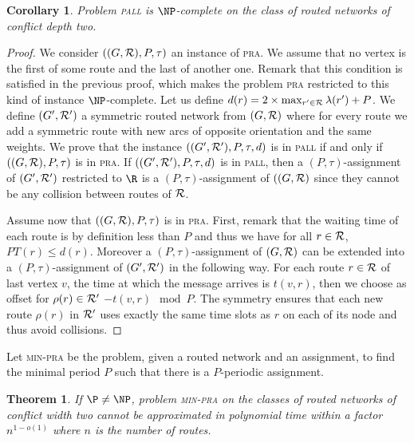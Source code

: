 \documentclass[10pt, conference, letterpaper]{IEEEtran}
\newtheorem{theorem}{Theorem}
\newtheorem{corollary}{Corollary}
\newcommand\pall{\textsc{pall}\xspace}
\newcommand\pra{\textsc{pra}\xspace}
\newcommand\minpra{\textsc{min-pra}\xspace}
\begin{document}
\begin{corollary}
Problem \pall is $\NP$-complete on the class of routed networks of conflict depth two.
\end{corollary}
\begin{proof}
 We consider $((G,{\cal R}),P,\tau)$ an instance of \pra. We assume that no vertex is the first of some route and the last of another one. Remark that this condition is satisfied in the previous proof, which makes the problem \pra restricted to this kind of instance $\NP$-complete. 
 Let us define $d(r) = 2 \times \max_{r' \in {\cal R}} \lambda(r') + P$. We define $(G',{\cal R}')$ a symmetric routed network from $(G,{\cal R})$ where for every route we add a symmetric route with new arcs of opposite orientation and the same weights.
 We prove that the instance $((G',{\cal R'}),P,\tau,d)$ is in \pall if and only if $((G,{\cal R}),P,\tau)$ is in \pra.
 If $((G',{\cal R'}),P,\tau,d)$ is in \pall, then a $(P,\tau)$-assignment of $(G',{\cal R'})$ restricted to $\R$ is a $(P,\tau)$-assignment of $((G,{\cal R})$ since they cannot be any collision between routes of ${\cal R}$.
 
 Assume now that $((G,{\cal R}),P,\tau)$ is in \pra. First, remark that the waiting time of each route is by definition less than $P$ and thus we have for all $r\in {\cal R}$, $PT(r) \leq d(r)$. Moreover a $(P,\tau)$-assignment of $(G,{\cal R})$ can be extended into a $(P,\tau)$-assignment of $(G',{\cal R'})$ in the following way. For each route $r \in \cal{R}$ of last vertex $v$, the time at which the message arrives is $t(v,r)$, then we choose as offset for $\rho(r) \in \cal{R}'$ $-t(v,r) \mod P$. The symmetry ensures that each new route $\rho(r)$ in ${\cal R'}$ uses exactly the same time slots as $r$ on each of its node and thus avoid collisions.
\end{proof}

Let \minpra be the problem, given a routed network and an assignment, to find the minimal period $P$ such that there is a $P$-periodic assignment. 

\begin{theorem}\label{th:inapprox}
If $\P \neq \NP$, problem \minpra on the classes of routed networks of conflict width two cannot be approximated in polynomial time within a factor $n^{1-o(1)}$ where $n$ is the number of routes.
\end{theorem}
\end{document}
